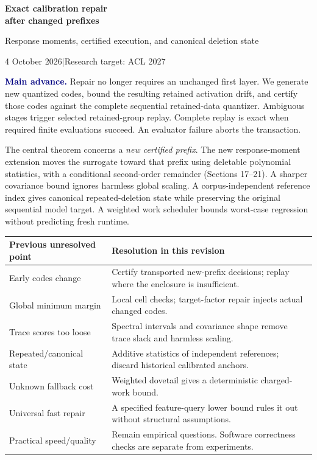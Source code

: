 \documentclass[11pt]{article}
\newcommand{\note}[1]{\textcolor{navy}{\textbf{#1}}}
\begin{document}
{\LARGE\bfseries Exact calibration repair\\[3pt] after changed prefixes}

{\large Response moments, certified execution, and canonical deletion state}\par
4 October 2026\quad |\quad Research target: ACL 2027

\note{Main advance.} Repair no longer requires an unchanged first layer. We generate new quantized codes, bound the resulting retained activation drift, and certify those codes against the complete sequential retained-data quantizer. Ambiguous stages trigger selected retained-group replay. Complete replay is exact when required finite evaluations succeed. An evaluator failure aborts the transaction.

The central theorem concerns a \emph{new certified prefix}. The new response-moment extension moves the surrogate toward that prefix using deletable polynomial statistics, with a conditional second-order remainder (Sections 17--21). A sharper covariance bound ignores harmless global scaling. A corpus-independent reference index gives canonical repeated-deletion state while preserving the original sequential model target. A weighted work scheduler bounds worst-case regression without predicting fresh runtime.

\begin{tabularx}{\linewidth}{@{}p{.30\linewidth}X@{}}\toprule
Previous unresolved point & Resolution in this revision\\\midrule
Early codes change & Certify transported new-prefix decisions; replay where the enclosure is insufficient.\\
Global minimum margin & Local cell checks; target-factor repair injects actual changed codes.\\
Trace scores too loose & Spectral intervals and covariance shape remove trace slack and harmless scaling.\\
Repeated/canonical state & Additive statistics of independent references; discard historical calibrated anchors.\\
Unknown fallback cost & Weighted dovetail gives a deterministic charged-work bound.\\
Universal fast repair & A specified feature-query lower bound rules it out without structural assumptions.\\
Practical speed/quality & Remain empirical questions. Software correctness checks are separate from experiments.\\\bottomrule
\end{tabularx}
\end{document}
